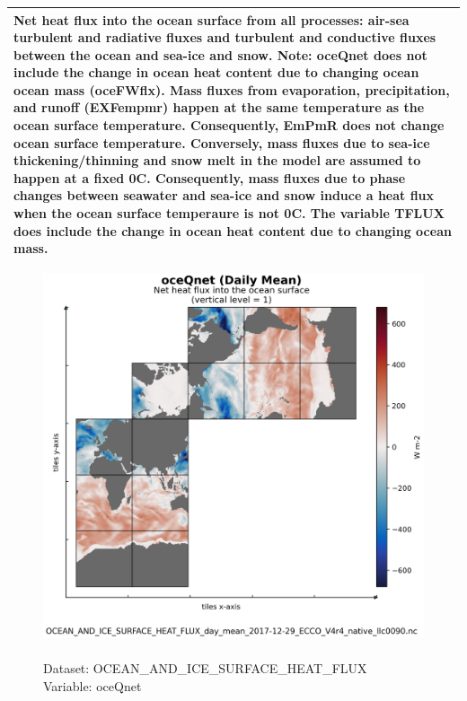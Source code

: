 \begin{longtable}{|p{}|p{}|p{}|p{}|}
\multicolumn{4}{|p{1\textwidth}|}{Net heat flux into the ocean surface from all processes: air-sea turbulent and radiative fluxes and turbulent and conductive fluxes between the ocean and sea-ice and snow. Note: oceQnet does not include the change in ocean heat content due to changing ocean ocean mass (oceFWflx). Mass fluxes from evaporation, precipitation, and runoff (EXFempmr) happen at the same temperature as the ocean surface temperature. Consequently, EmPmR does not change ocean surface temperature. Conversely, mass fluxes due to sea-ice thickening/thinning and snow melt in the model are assumed to happen at a fixed 0C. Consequently, mass fluxes due to phase changes between seawater and sea-ice and snow induce a heat flux when the ocean surface temperaure is not 0C. The variable TFLUX does include the change in ocean heat content due to changing ocean mass.} \\ \hline
\end{longtable}

\begin{figure}[H]
\centering
\includegraphics[scale=0.5]{../images/plots/native_plots/Ocean_and_Sea-Ice_Surface_Heat_Fluxes/oceQnet.png}
\caption{\\Dataset: OCEAN\_AND\_ICE\_SURFACE\_HEAT\_FLUX\\Variable: oceQnet}
\label{tab:table-OCEAN_AND_ICE_SURFACE_HEAT_FLUX_oceQnet-Plot}
\end{figure}
\pagebreak
